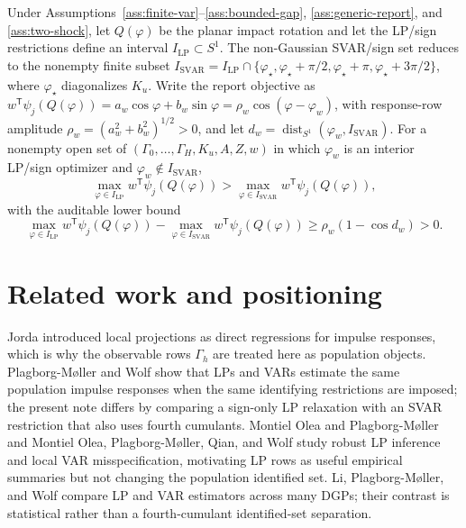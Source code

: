 \documentclass[11pt]{article}
\newcommand{\transpose}{\mathsf{T}}
\theoremstyle{definition}
\theoremstyle{plain}
\theoremstyle{remark}
\begin{document}
\begin{conjecture}\label{conj:two-shock-witness}
Under Assumptions~\ref{ass:finite-var}--\ref{ass:bounded-gap}, \ref{ass:generic-report}, and \ref{ass:two-shock}, let \(Q(\varphi)\) be the planar impact rotation and let the LP/sign restrictions define an interval \(I_{\mathrm{LP}}\subset S^1\).  The non-Gaussian SVAR/sign set reduces to the nonempty finite subset \(I_{\mathrm{SVAR}}=I_{\mathrm{LP}}\cap\{\varphi_\star,\varphi_\star+\pi/2,\varphi_\star+\pi,\varphi_\star+3\pi/2\}\), where \(\varphi_\star\) diagonalizes \(K_u\).  Write the report objective as \(w^\transpose\psi_j(Q(\varphi))=a_w\cos\varphi+b_w\sin\varphi=\rho_w\cos(\varphi-\varphi_w)\), with response-row amplitude \(\rho_w=(a_w^2+b_w^2)^{1/2}>0\), and let \(d_w=\operatorname{dist}_{S^1}(\varphi_w,I_{\mathrm{SVAR}})\).  For a nonempty open set of \((\Gamma_0,\ldots,\Gamma_H,K_u,A,Z,w)\) in which \(\varphi_w\) is an interior LP/sign optimizer and \(\varphi_w\notin I_{\mathrm{SVAR}}\),
\[
\max_{\varphi\in I_{\mathrm{LP}}}w^\transpose\psi_j(Q(\varphi))
>
\max_{\varphi\in I_{\mathrm{SVAR}}}w^\transpose\psi_j(Q(\varphi)),
\]
with the auditable lower bound
\[
\max_{\varphi\in I_{\mathrm{LP}}}w^\transpose\psi_j(Q(\varphi))
-
\max_{\varphi\in I_{\mathrm{SVAR}}}w^\transpose\psi_j(Q(\varphi))
\ge \rho_w(1-\cos d_w)>0.
\]
\end{conjecture}

\section{Related work and positioning}
Jorda \cite{Jorda2005} introduced local projections as direct regressions for
impulse responses, which is why the observable rows \(\Gamma_h\) are treated
here as population objects.  Plagborg-M{\o}ller and Wolf
\cite{PlagborgMollerWolf2021} show that LPs and VARs estimate the same
population impulse responses when the same identifying restrictions are
imposed; the present note differs by comparing a sign-only LP relaxation with
an SVAR restriction that also uses fourth cumulants.  Montiel Olea and
Plagborg-M{\o}ller \cite{MontielOleaPlagborgMoller2021} and Montiel Olea,
Plagborg-M{\o}ller, Qian, and Wolf
\cite{MontielOleaPlagborgMollerQianWolf2024} study robust LP inference and
local VAR misspecification, motivating LP rows as useful empirical summaries
but not changing the population identified set.  Li, Plagborg-M{\o}ller, and
Wolf \cite{LiPlagborgMollerWolf2024} compare LP and VAR estimators across many
DGPs; their contrast is statistical rather than a fourth-cumulant
identified-set separation.
\end{document}
